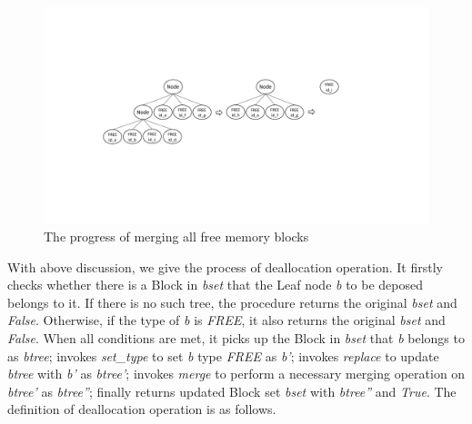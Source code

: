 \begin{figure}
	\centering
	\includegraphics[width=1\textwidth]{fig2.pdf}
	\caption{The progress of merging all free memory blocks}
	\label{fig2}
\end{figure}

With above discussion, we give the process of deallocation operation. It firstly checks whether there is a Block in \emph{bset} that the Leaf node \emph{b} to be deposed belongs to it. If there is no such tree, the procedure returns the original \emph{bset} and \emph{False}. Otherwise, if the type of \emph{b} is \emph{FREE}, it also returns the original \emph{bset} and \emph{False}. When all conditions are met, it picks up the Block in \emph{bset} that \emph{b} belongs to as \emph{btree}; invokes \emph{set\_type} to set \emph{b} type \emph{FREE} as \emph{b'}; invokes \emph{replace} to update \emph{btree} with \emph{b'} as \emph{btree'}; invokes \emph{merge} to perform a necessary merging operation on \emph{btree'} as \emph{btree''}; finally returns updated Block set \emph{bset} with \emph{btree''} and \emph{True}. The definition of deallocation operation is as follows.

